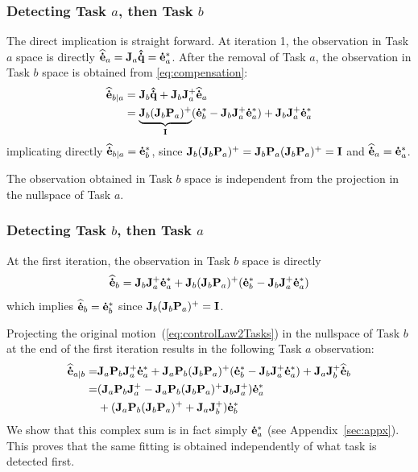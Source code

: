 \documentclass[journal]{IEEEtran}
\begin{document}
  \subsubsection{Detecting Task $a$, then Task $b$}
The direct implication is straight forward.
At iteration 1, the observation in Task $a$ space is directly
${\mathbf{\widehat{\dot{e}}}}_{a} = {\mathbf{J}}_a{\mathbf{\hat{\dot{q}}}} = {\mathbf{\dot{e}}}_{a}^*$.  
After the removal of Task $a$, the observation in Task $b$ space
is obtained from \eqref{eq:compensation}:
\begin{align*}
 {\mathbf{\widehat{\dot{e}}}}_{b|a} &=  {\mathbf{J}}_b{\mathbf{\hat{\dot{q}}}} +  {\mathbf{J}}_b {\mathbf{J}}_a^+ {\mathbf{\widehat{\dot{e}}}}_{a}\\
 &= \underbrace{{\mathbf{J}}_b({\mathbf{J}}_b {\mathbf{P}}_a)^+}_{{\mathbf{I}}} ({\mathbf{\dot{e}}}_{b}^* - {\mathbf{J}}_b {\mathbf{J}}_a^+{\mathbf{\dot{e}}}_{a}^*) + {\mathbf{J}}_b {\mathbf{J}}_a^+ {\mathbf{\dot{e}}}_{a}^*
\end{align*}
implicating directly ${\mathbf{\widehat{\dot{e}}}}_{b|a}={\mathbf{\dot{e}}}_{b}^*$, since ${\mathbf{J}}_b({\mathbf{J}}_b {\mathbf{P}}_a)^+ = {\mathbf{J}}_b {\mathbf{P}}_a({\mathbf{J}}_b {\mathbf{P}}_a)^+ = {\mathbf{I}}$ and ${\mathbf{\widehat{\dot{e}}}}_{a} = {\mathbf{\dot{e}}}_{a}^*$.

The observation obtained in Task $b$ space is independent from the
projection in the nullspace of Task $a$.\\

\subsubsection{Detecting Task $b$, then Task $a$}

At the first iteration, the observation in Task $b$ space is directly
\begin{equation*}
{\mathbf{\widehat{\dot{e}}}}_{b}  = {\mathbf{J}}_{b} {\mathbf{J}}_{a}^+ {\mathbf{\dot{e}}}_{a}^* + {\mathbf{J}}_{b} ( {\mathbf{J}}_{b} {\mathbf{P}}_{a} )^+ ( {\mathbf{\dot{e}}}_{b}^* - {\mathbf{J}}_{b} {\mathbf{J}}_{a}^+ {\mathbf{\dot{e}}}_{a}^* )
\end{equation*}
which implies ${\mathbf{\widehat{\dot{e}}}}_{b} = {\mathbf{\dot{e}}}_{b}^*$ since ${\mathbf{J}}_{b} ( {\mathbf{J}}_{b} {\mathbf{P}}_{a} )^+ = {\mathbf{I}}$.

Projecting the original motion~(\ref{eq:controlLaw2Tasks}) in the nullspace of Task $b$ at the
end of the first iteration results in the following Task $a$ observation:
\begin{align*}
{\mathbf{\widehat{\dot{e}}}}_{a|b} =& {\mathbf{J}}_{a} {\mathbf{P}}_{b} {\mathbf{J}}_{a}^+ {\mathbf{\dot{e}}}_{a}^* +
 {\mathbf{J}}_{a} {\mathbf{P}}_{b} ({\mathbf{J}}_{b} {\mathbf{P}}_{a} )^+ ( {\mathbf{\dot{e}}}_{b}^* - {\mathbf{J}}_{b} {\mathbf{J}}_{a}^+ {\mathbf{\dot{e}}}_{a}^*)
+ {\mathbf{J}}_{a} {\mathbf{J}}_{b}^+ {\mathbf{\widehat{\dot{e}}}}_{b} \\
=& ({\mathbf{J}}_{a} {\mathbf{P}}_{b} {\mathbf{J}}_{a}^+ - {\mathbf{J}}_{a} {\mathbf{P}}_{b} ({\mathbf{J}}_{b} {\mathbf{P}}_{a} )^+ {\mathbf{J}}_{b} {\mathbf{J}}_{a}^+) {\mathbf{\dot{e}}}_{a}^* \\
&+ ({\mathbf{J}}_{a} {\mathbf{P}}_{b} ({\mathbf{J}}_{b} {\mathbf{P}}_{a} )^+ + {\mathbf{J}}_{a} {\mathbf{J}}_{b}^+) {\mathbf{\dot{e}}}_{b}^*
\end{align*}
We show that this complex sum is in fact simply ${\mathbf{\dot{e}}}_{a}^*$ (see Appendix~\ref{sec:appx}).
%
This proves that the same fitting is obtained independently of what task is
detected first.\QED 
\end{document}
